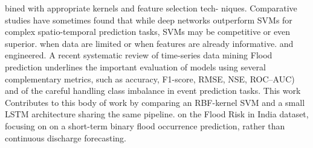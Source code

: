 \documentclass[conference]{IEEEtran}
\begin{document}
bined with appropriate kernels and feature selection tech-
niques. Comparative studies have sometimes found that while
deep networks outperform SVMs for complex spatio-temporal
prediction tasks, SVMs may be competitive or even superior.
when data are limited or when features are already informative.
and engineered.
A recent systematic review of time-series data mining
Flood prediction underlines the important evaluation of
models using several complementary metrics, such as accuracy,
F1-score, RMSE, NSE, ROC–AUC) and of the careful handling
class imbalance in event prediction tasks. This work
Contributes to this body of work by comparing an RBF-kernel
SVM and a small LSTM architecture sharing the same pipeline.
on the Flood Risk in India dataset, focusing on
on a short-term binary flood occurrence prediction, rather than
continuous discharge forecasting. 
\end{document}
